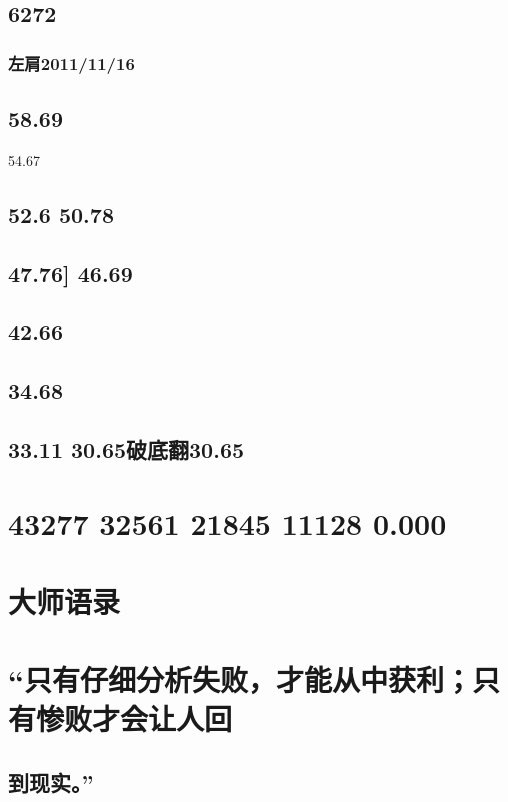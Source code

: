 \documentclass{article}
\begin{document}
\subsection{6272}

\subsubsection{左肩2011/11/16}

\subsection{58.69}

54.67

\subsection{52.6 50.78}

\subsection{47.76] 46.69}

\subsection{42.66}

\subsection{34.68}

\subsection{33.11 30.65破底翻30.65}

\section{43277 32561 21845 11128 0.000}

\section{大师语录}

\section{“只有仔细分析失败，才能从中获利；只有惨败才会让人回}

\subsection{到现实。”}
\end{document}
